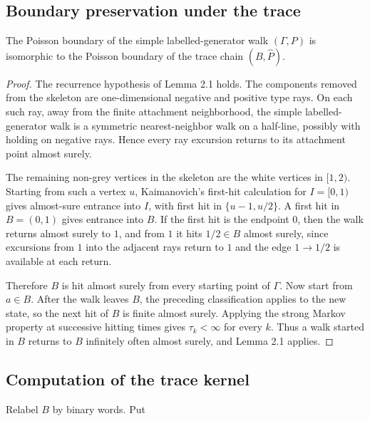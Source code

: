 \documentclass[11pt,a4paper]{scrartcl}
\begin{document}
\subsection{Boundary preservation under the trace}\label{subsec:boundary-preservation-under-the-trace}


\begin{proposition}\label{prop:trace-preserves-boundary}
The Poisson boundary of the simple labelled-generator walk
\((\Gamma,P)\) is isomorphic to the Poisson boundary of the trace chain
\((B,\widehat P)\).

\end{proposition}
\begin{proof}
The recurrence hypothesis of Lemma 2.1 holds.
The components removed from the skeleton are one-dimensional negative and
positive type rays. On each such ray, away from the finite attachment
neighborhood, the simple labelled-generator walk is a symmetric
nearest-neighbor walk on a half-line, possibly with holding on negative rays.
Hence every ray excursion returns to its attachment point almost surely.

The remaining non-grey vertices in the skeleton are the white vertices in
\([1,2)\). Starting from such a vertex \(u\), Kaimanovich's first-hit
calculation for \(I=[0,1)\) gives almost-sure entrance into \(I\), with first
hit in \(\{u-1,u/2\}\). A first hit in \(B=(0,1)\) gives entrance into \(B\).
If the first hit is the endpoint \(0\), then the walk returns almost surely to
\(1\), and from \(1\) it hits \(1/2\in B\) almost surely, since excursions from
\(1\) into the adjacent rays return to \(1\) and the edge \(1\to1/2\) is
available at each return.

Therefore \(B\) is hit almost surely from every starting point of \(\Gamma\).
Now start from \(a\in B\). After the walk leaves \(B\), the preceding
classification applies to the new state, so the next hit of \(B\) is finite
almost surely. Applying the strong Markov property at successive hitting times
gives \(\tau_k<\infty\) for every \(k\). Thus a walk started in \(B\) returns
to \(B\) infinitely often almost surely, and Lemma 2.1 applies.
\end{proof}


\subsection{Computation of the trace kernel}\label{subsec:computation-of-the-trace-kernel}


Relabel \(B\) by binary words. Put
\end{document}
